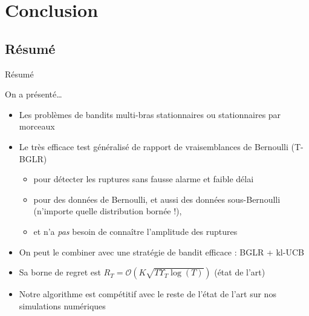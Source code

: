 \documentclass[11pt,french,ignorenonframetext,]{beamer}
\providecommand{\tightlist}{%
  \setlength{\itemsep}{0pt}\setlength{\parskip}{0pt}}
\begin{document}







\section{\hfill{}Conclusion\hfill{}}
\subsection{Résumé}

\begin{frame}{Résumé}

  On a présenté\ldots{}
  \begin{itemize}
    \item
    Les problèmes de bandits multi-bras stationnaires ou \alert{stationnaires par morceaux}
    \item
    Le très efficace test généralisé de rapport de vraisemblances de Bernoulli (T-BGLR) \dCooley{}
    \begin{itemize}\tightlist
      \item
      pour détecter les ruptures \alert{sans fausse alarme} et \alert{faible délai}
      \item
      pour des données de Bernoulli, et aussi des données sous-Bernoulli (n'importe quelle distribution bornée !),
      \item
      et n'a \emph{pas} besoin de connaître l'amplitude des ruptures
    \end{itemize}
    \item
    On peut le combiner avec une stratégie de bandit efficace :
    \alert{BGLR + kl-UCB}  \dCooley{}
    \item
    Sa borne de regret est $R_T = \mathcal{O}(K \sqrt{T \Upsilon_T \log(T)})$  \dCooley{} (état de l'art)
    \item
    Notre algorithme est compétitif avec le reste de l'état de l'art sur nos simulations numériques\dCooley
  \end{itemize}

\end{frame}
\end{document}
